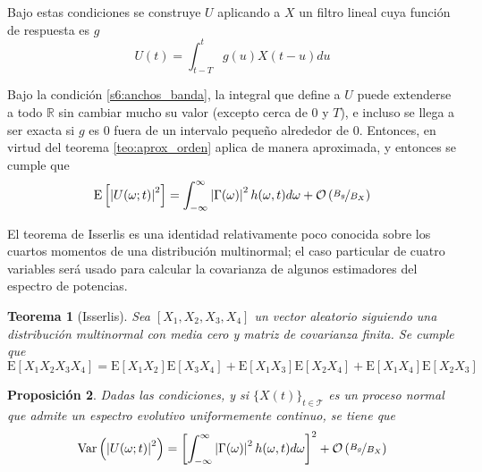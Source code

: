 \documentclass[12pt,letterpaper]{book}
\newtheorem{teorema}{Teorema}[chapter]
\newtheorem{proposicion}[teorema]{Proposición}
\newcommand{\R}{\mathbb{R}}
\newcommand{\intR}{\int_{-\infty}^{\infty}}
\newcommand{\E}[1]{\mathrm{E}\left[ #1 \right]}
\newcommand{\Var}[1]{\mathrm{Var}\left( #1 \right)}
\newcommand{\abso}[1]{\left| #1 \right|}
\newcommand{\xt}{$\{X(t)\}_{t\in \mathcal{T}}$ }
\newcommand{\orden}[1]{\mathcal{O}\left( #1 \right)}
\begin{document}
Bajo estas condiciones se construye $U$ aplicando a $X$ un filtro lineal cuya función de respuesta es $g$
\begin{equation}
U(t) = \int_{t-T}^{t} g(u) X(t-u) du
\end{equation}

Bajo la condición \ref{s6:anchos_banda}, la integral que define a $U$ puede extenderse a todo $\R$ sin cambiar mucho su valor (excepto cerca de 0 y $T$), e incluso se llega a ser exacta si $g$ es 0 fuera de un intervalo pequeño alrededor de 0. Entonces, en virtud del teorema \ref{teo:aprox_orden} aplica de manera aproximada, y entonces se cumple que
\begin{equation}
\E{\abso{U(\omega; t)}^{2}} = \intR \abso{\Gamma(\omega)}^{2} h(\omega, t)d\omega + \orden{\nicefrac{B_g}{B_X}}
\end{equation}

El teorema de Isserlis es una identidad relativamente poco conocida sobre los cuartos momentos de una distribución multinormal; el caso particular de cuatro variables será usado para calcular la covarianza de algunos estimadores del espectro de potencias.

\begin{teorema}[Isserlis]
\label{teo:isserlis}
Sea $[X_1, X_2, X_3, X_4]$ un vector aleatorio siguiendo una distribución multinormal con media cero y matriz de covarianza finita. Se cumple que
\begin{equation}
\E{X_1 X_2 X_3 X_4} = \E{X_1 X_2} \E{X_3 X_4} + \E{X_1 X_3} \E{X_2 X_4} + \E{X_1 X_4} \E{X_2 X_3}
\end{equation}
\end{teorema}

\begin{proposicion}
\label{teo:var_U}
Dadas las condiciones, y si \xt es un proceso normal que admite un espectro evolutivo uniformemente continuo, se tiene que
\begin{equation}
\Var{\abso{U(\omega;t)}^{2}} = \left[ \intR \abso{\Gamma(\omega)}^{2} h(\omega, t)d\omega \right]^{2} + \orden{\nicefrac{B_g}{B_X}}
\end{equation}
\end{proposicion}
\end{document}

